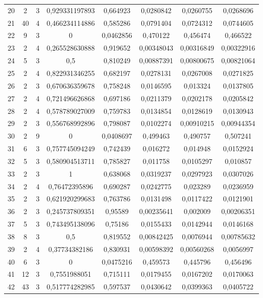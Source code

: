 \begin{longtable}{|c|c|c|c|c|c|c|c|}
20 & 2 & 3 & 0,929331197893 & 0,664923 & 0,0280842 & 0,0260755 & 0,0268696  \\
21 & 40 & 4 & 0,466234114886 & 0,585286 & 0,0791404 & 0,0724312 & 0,0744605  \\
22 & 9 & 3 & 0 & 0,0462856 & 0,470122 & 0,456474 & 0,466522  \\
23 & 2 & 4 & 0,265528630888 & 0,919652 & 0,00348043 & 0,00316849 & 0,00322916  \\
24 & 5 & 3 & 0,5 & 0,810249 & 0,00887391 & 0,00800675 & 0,00821064  \\
25 & 2 & 4 & 0,822931346255 & 0,682197 & 0,0278131 & 0,0267008 & 0,0271825  \\
26 & 2 & 3 & 0,670636359678 & 0,758248 & 0,0146595 & 0,013324 & 0,0137805  \\
27 & 2 & 4 & 0,721496626868 & 0,697186 & 0,0211379 & 0,0202178 & 0,0205842  \\
28 & 2 & 4 & 0,578789027009 & 0,759783 & 0,0134854 & 0,0128619 & 0,0130943  \\
29 & 2 & 3 & 0,556768992896 & 0,798087 & 0,0102274 & 0,00910215 & 0,00944354  \\
30 & 2 & 9 & 0 & 0,0408697 & 0,499463 & 0,490757 & 0,507241  \\
31 & 6 & 3 & 0,757745094249 & 0,742439 & 0,016272 & 0,014948 & 0,0152924  \\
32 & 5 & 3 & 0,580904513711 & 0,785827 & 0,011758 & 0,0105297 & 0,010857  \\
33 & 2 & 3 & 1 & 0,638068 & 0,0319237 & 0,0297923 & 0,0307026  \\
34 & 2 & 4 & 0,76472395896 & 0,690287 & 0,0242775 & 0,023289 & 0,0236959  \\
35 & 2 & 3 & 0,621920299683 & 0,763786 & 0,0131498 & 0,0117422 & 0,0121901  \\
36 & 2 & 3 & 0,245737809351 & 0,95589 & 0,00235641 & 0,002009 & 0,00206351  \\
37 & 5 & 3 & 0,743495138096 & 0,75186 & 0,0155433 & 0,0142944 & 0,0146168  \\
38 & 8 & 3 & 0,5 & 0,819552 & 0,00842425 & 0,0076944 & 0,00785632  \\
39 & 2 & 4 & 0,37734382186 & 0,830931 & 0,00598392 & 0,00560268 & 0,0056997  \\
40 & 6 & 3 & 0 & 0,0475216 & 0,459573 & 0,445796 & 0,456496  \\
41 & 12 & 3 & 0,7551988051 & 0,715111 & 0,0179455 & 0,0167202 & 0,0170063  \\
42 & 43 & 3 & 0,517774282985 & 0,597537 & 0,0430642 & 0,0399363 & 0,0405722  \\

\end{longtable}
